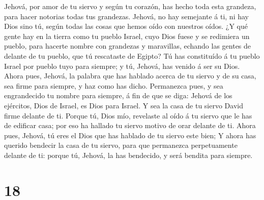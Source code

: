 Jehová, por amor de tu siervo y según tu corazón, has hecho toda esta
grandeza, para hacer notorias todas tus grandezas.  Jehová,
no hay semejante á ti, ni hay Dios sino tú, según todas las cosas que
hemos oído con nuestros oídos.  ¿Y qué gente hay en la
tierra como tu pueblo Israel, cuyo Dios fuese y se redimiera un pueblo,
para hacerte nombre con grandezas y maravillas, echando las gentes de
delante de tu pueblo, que tú rescataste de Egipto?  Tú has
constituído á tu pueblo Israel por pueblo tuyo para siempre; y tú,
Jehová, has venido á ser su Dios.  Ahora pues, Jehová, la
palabra que has hablado acerca de tu siervo y de su casa, sea firme para
siempre, y haz como has dicho.  Permanezca pues, y sea
engrandecido tu nombre para siempre, á fin de que se diga: Jehová de los
ejércitos, Dios de Israel, es Dios para Israel. Y sea la casa de tu
siervo David firme delante de ti.  Porque tú, Dios mío,
revelaste al oído á tu siervo que le has de edificar casa; por eso ha
hallado tu siervo motivo de orar delante de ti.  Ahora
pues, Jehová, tú eres el Dios que has hablado de tu siervo este bien;
 Y ahora has querido bendecir la casa de tu siervo, para
que permanezca perpetuamente delante de ti: porque tú, Jehová, la has
bendecido, y será bendita para siempre.

\hypertarget{section-17}{%
\section{18}\label{section-17}}

